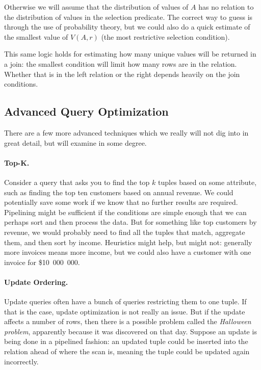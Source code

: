 Otherwise we will assume that the distribution of values of $A$ has no relation to the distribution of values in the selection predicate. The correct way to guess is through the use of probability theory, but we could also do a quick estimate of the smallest value of $V(A, r)$ (the most restrictive selection condition). 

This same logic holds for estimating how many unique values will be returned in a join: the smallest condition will limit how many rows are in the relation. Whether that is in the left relation or the right depends heavily on the join conditions. 

\subsection*{Advanced Query Optimization}

There are a few more advanced techniques which we really will not dig into in great detail, but will examine in some degree. 

\paragraph{Top-K.} Consider a query that asks you to find the top $k$ tuples based on some attribute, such as finding the top ten customers based on annual revenue. We could potentially save some work if we know that no further results are required. Pipelining might be sufficient if the conditions are simple enough that we can perhaps sort and then process the data. But for something like top customers by revenue, we would probably need to find all the tuples that match, aggregate them, and then sort by income. Heuristics might help, but might not: generally more invoices means more income, but we could also have a customer with one invoice for \$10~000~000. 

\paragraph{Update Ordering.} 

Update queries often have a bunch of queries restricting them to one tuple. If that is the case, update optimization is not really an issue. But if the update affects a number of rows, then there is a possible problem called the \textit{Halloween problem}, apparently because it was discovered on that day. Suppose an update is being done in a pipelined fashion: an updated tuple could be inserted into the relation ahead of where the scan is, meaning the tuple could be updated again incorrectly. 

